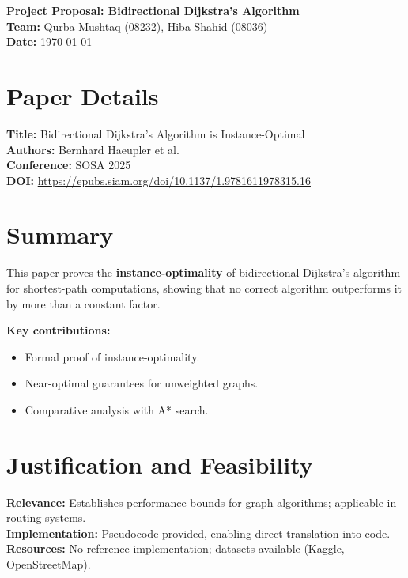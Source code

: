\documentclass[10pt]{article}
\begin{document}
\begin{center}
    {\LARGE \textbf{Project Proposal: Bidirectional Dijkstra's Algorithm}} \\
    \vspace{0.5em}
    {\large \textbf{Team:} Qurba Mushtaq (08232), Hiba Shahid (08036)} \\
    {\large \textbf{Date:} \today}
\end{center}

\section*{Paper Details}
\textbf{Title:} Bidirectional Dijkstra's Algorithm is Instance-Optimal\\
\textbf{Authors:} Bernhard Haeupler et al.\\
\textbf{Conference:} SOSA 2025\\
\textbf{DOI:} \url{https://epubs.siam.org/doi/10.1137/1.9781611978315.16}

\section*{Summary}
This paper proves the \textbf{instance-optimality} of bidirectional Dijkstra's algorithm for shortest-path computations, showing that no correct algorithm outperforms it by more than a constant factor.

\textbf{Key contributions:}
\begin{itemize}
    \item Formal proof of instance-optimality.
    \item Near-optimal guarantees for unweighted graphs.
    \item Comparative analysis with A* search.
\end{itemize}

\section*{Justification and Feasibility}
\textbf{Relevance:} Establishes performance bounds for graph algorithms; applicable in routing systems.\\
\textbf{Implementation:} Pseudocode provided, enabling direct translation into code.\\
\textbf{Resources:} No reference implementation; datasets available (Kaggle, OpenStreetMap).
\end{document}
